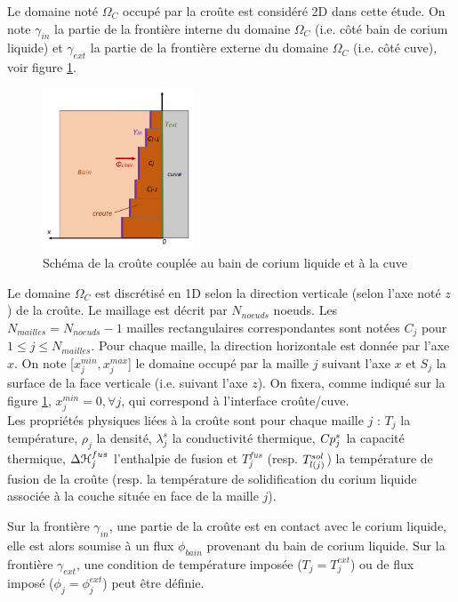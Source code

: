 Le domaine noté $\Omega_C$ occupé par la croûte est considéré 2D dans cette étude. On note $\gamma_{in}$ la partie de la frontière interne du domaine $\Omega_C$ (i.e. côté bain de corium liquide) et $\gamma_{ext}$ la partie de la frontière externe du domaine $\Omega_C$ (i.e. côté cuve), voir figure \ref{fig:crust_figure}. 

\begin{figure}[H]
\centering
\includegraphics[width=0.4\textwidth]{Figures/crust_figure.png}
\caption{Schéma de la croûte couplée au bain de corium liquide et à la cuve} \label{fig:crust_figure}
\end{figure}

Le domaine $\Omega_C$ est discrétisé en 1D selon la direction verticale (selon l'axe noté $z$) de la croûte. Le maillage est décrit par $N_{noeuds}$ noeuds. Les $N_{mailles}=N_{noeuds}-1$ mailles rectangulaires correspondantes sont notées $C_j$ pour $1 \leq j\leq N_{mailles}$. Pour chaque maille, la direction horizontale est donnée par l'axe $x$. On note [$x_j^{min}, x_j^{max}$] le domaine occupé par la maille $j$ suivant l'axe $x$ et $S_j$ la surface de la face verticale (i.e. suivant l'axe $z$). On fixera, comme indiqué sur la figure \ref{fig:crust_figure}, $x_j^{min}=0,\forall j$, qui correspond à l'interface croûte/cuve.\\

Les propriétés physiques liées à la croûte sont pour chaque maille $j$ : $T_j$ la température, $\rho_j$ la densité, $\lambda^s_j$ la conductivité thermique, $\heatCp[s]{j}$ la capacité thermique, $\Delta {\cal H}_j^{fus}$ l'enthalpie de fusion et $T_j^{fus}$ (resp. $\temperature[sol]{l(j)}$) la température de fusion de la croûte (resp. la température de solidification du corium liquide associée à la couche située en face de la maille $j$).

 Sur la frontière $\gamma_{in}$, une partie de la croûte est en contact avec le corium liquide, elle est alors soumise à un flux $\phi_{bain}$ provenant du bain de corium liquide. Sur la frontière $\gamma_{ext}$, une condition de température imposée ($T_j=T_j^{ext}$) ou de flux imposé ($\phi_j=\phi_j^{ext}$) peut être définie.\\
 
